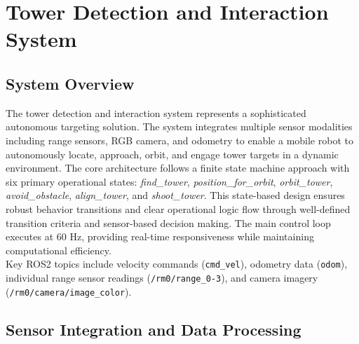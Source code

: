 \section{Tower Detection and Interaction System}
\subsection{System Overview}
The tower detection and interaction system represents a sophisticated autonomous targeting solution. The system integrates multiple sensor modalities including range sensors, RGB camera, and odometry to enable a mobile robot to autonomously locate, approach, orbit, and engage tower targets in a dynamic environment.
The core architecture follows a finite state machine approach with six primary operational states: \textit{find\_tower}, \textit{position\_for\_orbit}, \textit{orbit\_tower}, \textit{avoid\_obstacle}, \textit{align\_tower}, and \textit{shoot\_tower}. This state-based design ensures robust behavior transitions and clear operational logic flow through well-defined transition criteria and sensor-based decision making.
The main control loop executes at 60 Hz, providing real-time responsiveness while maintaining computational efficiency. \\
Key ROS2 topics include velocity commands (\texttt{cmd\_vel}), odometry data (\texttt{odom}), individual range sensor readings (\texttt{/rm0/range\_{0-3}}), and camera imagery (\texttt{/rm0/camera/image\_color}).
\subsection{Sensor Integration and Data Processing}
